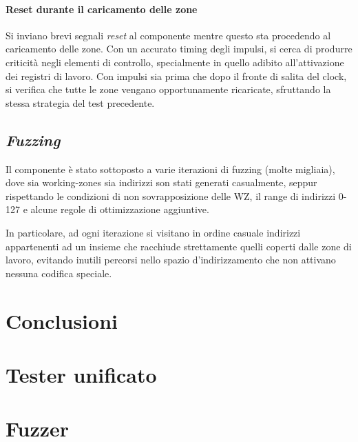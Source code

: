 \documentclass[11pt,a4paper]{article}
\begin{document}
\paragraph{Reset durante il caricamento delle zone}
Si inviano brevi segnali \emph{reset} al componente mentre questo sta procedendo al caricamento delle zone. Con un accurato timing degli impulsi, si cerca
di produrre criticità negli elementi di controllo, specialmente in quello adibito all'attivazione dei registri di lavoro. Con impulsi sia prima che dopo
il fronte di salita del clock, si verifica che tutte le zone vengano opportunamente ricaricate, sfruttando la stessa strategia del test precedente.

\subsection{\emph{Fuzzing}}
Il componente è stato sottoposto a varie iterazioni di fuzzing (molte migliaia), dove sia working-zones sia indirizzi son stati generati casualmente,
seppur rispettando le condizioni di non sovrapposizione delle WZ, il range di indirizzi 0-127 e alcune regole di ottimizzazione aggiuntive.

In particolare, ad ogni iterazione si visitano in ordine casuale indirizzi appartenenti ad un insieme che racchiude strettamente quelli coperti dalle
zone di lavoro, evitando inutili percorsi nello spazio d'indirizzamento che non attivano nessuna codifica speciale.

\section{Conclusioni}

\newpage

\appendix
\section{Tester unificato}
\label{appendix:unitest}
\section{Fuzzer}
\label{appendix:fuzzer}
\end{document}
